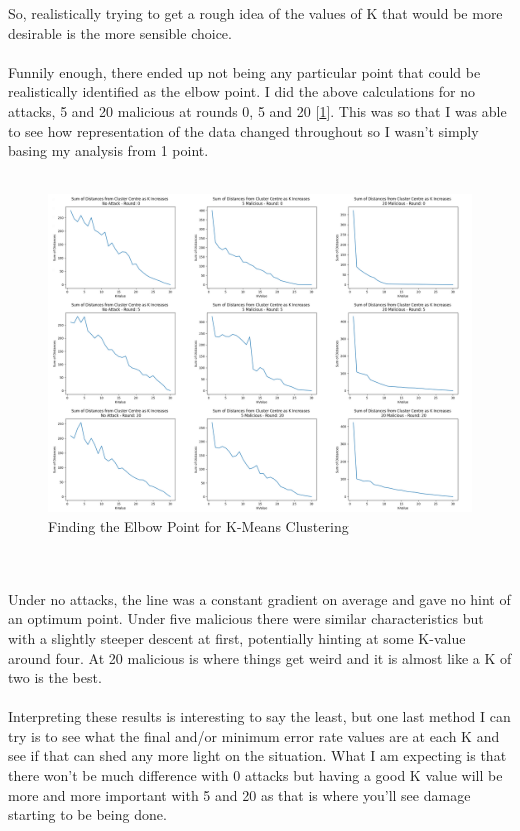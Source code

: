 So, realistically trying to get a rough idea of the values of K that would be more desirable is the more sensible choice.
\\ \\
Funnily enough, there ended up not being any particular point that could be realistically identified as the elbow point.
I did the above calculations for no attacks, 5 and 20 malicious at rounds 0, 5 and 20 [\ref{fig:k_elbow}].
This was so that I was able to see how representation of the data changed throughout so I wasn't simply basing my analysis from 1 point.
\\ \\
\begin{figure}[htbp]
	\centering
    \includegraphics[scale=0.25]{my_agg/graphs/k_elbow.png}
	\caption{Finding the Elbow Point for K-Means Clustering}
	\label{fig:k_elbow}
\end{figure}
\\ \\
Under no attacks, the line was a constant gradient on average and gave no hint of an optimum point.
Under five malicious there were similar characteristics but with a slightly steeper descent at first, potentially hinting at some K-value around four.
At 20 malicious is where things get weird and it is almost like a K of two is the best.
\\ \\
Interpreting these results is interesting to say the least, but one last method I can try is to see what the final and/or minimum error rate values are at each K and see if that can shed any more light on the situation.
What I am expecting is that there won't be much difference with 0 attacks but having a good K value will be more and more important with 5 and 20 as that is where you'll see damage starting to be being done.
